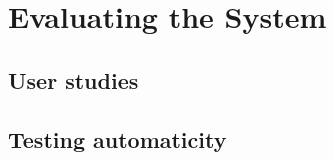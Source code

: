 
\newpage
\section{Evaluating the System}

  \subsection{User studies}

  \subsection{Testing automaticity}

